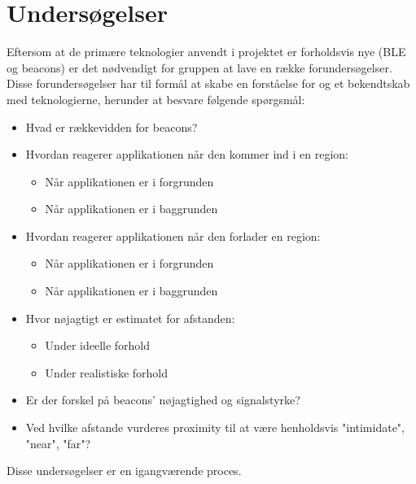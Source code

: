 \chapter{Undersøgelser}
Eftersom at de primære teknologier anvendt i projektet er forholdsvis nye (BLE og beacons) er det nødvendigt for gruppen at lave en række forundersøgelser. Disse forundersøgelser har til formål at skabe en forståelse for og et bekendtskab med teknologierne, herunder at besvare følgende spørgsmål:
\begin{itemize}
\item Hvad er rækkevidden for beacons?
\item Hvordan reagerer applikationen når den kommer ind i en region:
\begin{itemize}
\item Når applikationen er i forgrunden
\item Når applikationen er i baggrunden
\end{itemize}
\item Hvordan reagerer applikationen når den forlader en region:
\begin{itemize}
\item Når applikationen er i forgrunden
\item Når applikationen er i baggrunden
\end{itemize}
\item Hvor nøjagtigt er estimatet for afstanden:
\begin{itemize}
\item Under ideelle forhold
\item Under realistiske forhold
\end{itemize}
\item Er der forskel på beacons' nøjagtighed og signalstyrke?
\item Ved hvilke afstande vurderes proximity til at være henholdsvis "intimidate", "near", "far"?
\end{itemize}

Disse undersøgelser er en igangværende proces.